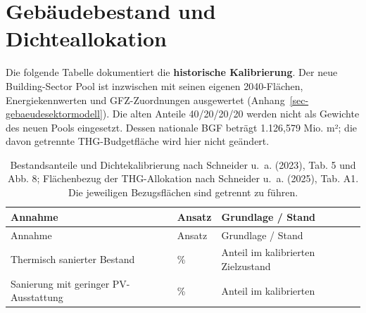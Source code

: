 \documentclass[
  ngerman,
  a4paper,
  DIV=11]{scrreprt}
\begin{document}
\section{Gebäudebestand und
Dichteallokation}\label{gebuxe4udebestand-und-dichteallokation}

Die folgende Tabelle dokumentiert die \textbf{historische Kalibrierung}.
Der neue Building-Sector Pool ist inzwischen mit seinen eigenen
2040-Flächen, Energiekennwerten und GFZ-Zuordnungen ausgewertet
(Anhang~\ref{sec-gebaeudesektormodell}). Die alten Anteile 40/20/20/20
werden nicht als Gewichte des neuen Pools eingesetzt. Dessen nationale
BGF beträgt 1.126,579 Mio. m²; die davon getrennte THG-Budgetfläche wird
hier nicht geändert.

\begin{longtable}[]{@{}
  >{\raggedright\arraybackslash}p{}
  >{\raggedright\arraybackslash}p{}
  >{\raggedright\arraybackslash}p{}@{}}
\caption{Bestandsanteile und Dichtekalibrierung nach Schneider u.~a.
(2023), Tab. 5 und Abb. 8; Flächenbezug der THG-Allokation nach
Schneider u.~a. (2025), Tab. A1. Die jeweiligen Bezugsflächen sind
getrennt zu führen.}\tabularnewline
\toprule\noalign{}
\begin{minipage}[b]{\linewidth}\raggedright
Annahme
\end{minipage} & \begin{minipage}[b]{\linewidth}\raggedright
Ansatz
\end{minipage} & \begin{minipage}[b]{\linewidth}\raggedright
Grundlage / Stand
\end{minipage} \\
\midrule\noalign{}
\endfirsthead
\toprule\noalign{}
\begin{minipage}[b]{\linewidth}\raggedright
Annahme
\end{minipage} & \begin{minipage}[b]{\linewidth}\raggedright
Ansatz
\end{minipage} & \begin{minipage}[b]{\linewidth}\raggedright
Grundlage / Stand
\end{minipage} \\
\midrule\noalign{}
\endhead
\bottomrule\noalign{}
\endlastfoot
Thermisch sanierter Bestand & 40 \% & Anteil im kalibrierten
Zielzustand \\
Sanierung mit geringer PV-Ausstattung & 20 \% & Anteil im kalibrierten

\end{longtable}
\end{document}
